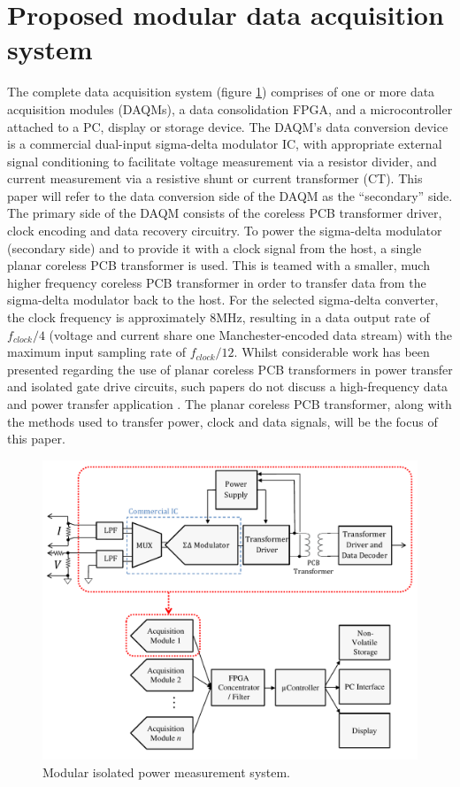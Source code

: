 \documentclass[conference]{IEEEtran}
\begin{document}
\section{Proposed modular data acquisition system}
The complete data acquisition system (figure \ref{fig:FullSystem}) comprises of one or more data acquisition modules (DAQMs), a data consolidation FPGA, and a microcontroller attached to a PC, display or storage device.  
The DAQM's data conversion device is a commercial dual-input sigma-delta modulator IC, with appropriate external signal conditioning to facilitate voltage measurement via a resistor divider, and current measurement via a resistive shunt or current transformer (CT).  This paper will refer to the data conversion side of the DAQM as the ``secondary'' side.  The primary side of the DAQM consists of the coreless PCB transformer driver, clock encoding and data recovery circuitry.  To power the sigma-delta modulator (secondary side) and to provide it with a clock signal from the host, a single planar coreless PCB transformer is used.  This is teamed with a smaller, much higher frequency coreless PCB transformer in order to transfer data from the sigma-delta modulator back to the host.  For the selected sigma-delta converter, the clock frequency is approximately 8MHz, resulting in a data output rate of $ f_{clock}/4 $ (voltage and current share one Manchester-encoded data stream) with the maximum input sampling rate of $ f_{clock}/12 $.
Whilst considerable work has been presented regarding the use of planar coreless PCB transformers in power transfer and isolated gate drive circuits, such papers do not discuss a high-frequency data and power transfer application \cite{TangHuiFundamental}\cite{NaturallySoft}\cite{OptimalOperation}\cite{CorelessGateDrive}.  The planar coreless PCB transformer, along with the methods used to transfer power, clock and data signals, will be the focus of this paper.

\begin{figure}[t]
	\centering
	\includegraphics[width=1\columnwidth]{./img/FullSystem_BasicCol}
	\caption{Modular isolated power measurement system.}
	\label{fig:FullSystem}
\end{figure}
\end{document}
